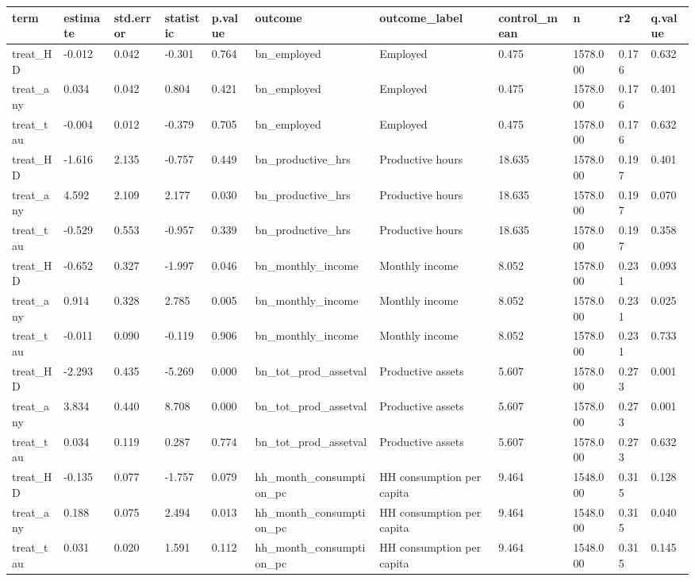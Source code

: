 \begin{tabular}{lllllllllll}
\toprule
term & estimate & std.error & statistic & p.value & outcome & outcome\_label & control\_mean & n & r2 & q.value
 \\
\midrule
treat\_HD & -0.012 & 0.042 & -0.301 & 0.764 & bn\_employed & Employed & 0.475 & 1578.000 & 0.176 & 0.632 \\
treat\_any & 0.034 & 0.042 & 0.804 & 0.421 & bn\_employed & Employed & 0.475 & 1578.000 & 0.176 & 0.401 \\
treat\_tau & -0.004 & 0.012 & -0.379 & 0.705 & bn\_employed & Employed & 0.475 & 1578.000 & 0.176 & 0.632 \\
treat\_HD & -1.616 & 2.135 & -0.757 & 0.449 & bn\_productive\_hrs & Productive hours & 18.635 & 1578.000 & 0.197 & 0.401 \\
treat\_any & 4.592 & 2.109 & 2.177 & 0.030 & bn\_productive\_hrs & Productive hours & 18.635 & 1578.000 & 0.197 & 0.070 \\
treat\_tau & -0.529 & 0.553 & -0.957 & 0.339 & bn\_productive\_hrs & Productive hours & 18.635 & 1578.000 & 0.197 & 0.358 \\
treat\_HD & -0.652 & 0.327 & -1.997 & 0.046 & bn\_monthly\_income & Monthly income & 8.052 & 1578.000 & 0.231 & 0.093 \\
treat\_any & 0.914 & 0.328 & 2.785 & 0.005 & bn\_monthly\_income & Monthly income & 8.052 & 1578.000 & 0.231 & 0.025 \\
treat\_tau & -0.011 & 0.090 & -0.119 & 0.906 & bn\_monthly\_income & Monthly income & 8.052 & 1578.000 & 0.231 & 0.733 \\
treat\_HD & -2.293 & 0.435 & -5.269 & 0.000 & bn\_tot\_prod\_assetval & Productive assets & 5.607 & 1578.000 & 0.273 & 0.001 \\
treat\_any & 3.834 & 0.440 & 8.708 & 0.000 & bn\_tot\_prod\_assetval & Productive assets & 5.607 & 1578.000 & 0.273 & 0.001 \\
treat\_tau & 0.034 & 0.119 & 0.287 & 0.774 & bn\_tot\_prod\_assetval & Productive assets & 5.607 & 1578.000 & 0.273 & 0.632 \\
treat\_HD & -0.135 & 0.077 & -1.757 & 0.079 & hh\_month\_consumption\_pc & HH consumption per capita & 9.464 & 1548.000 & 0.315 & 0.128 \\
treat\_any & 0.188 & 0.075 & 2.494 & 0.013 & hh\_month\_consumption\_pc & HH consumption per capita & 9.464 & 1548.000 & 0.315 & 0.040 \\
treat\_tau & 0.031 & 0.020 & 1.591 & 0.112 & hh\_month\_consumption\_pc & HH consumption per capita & 9.464 & 1548.000 & 0.315 & 0.145 \\
\bottomrule
\end{tabular}
